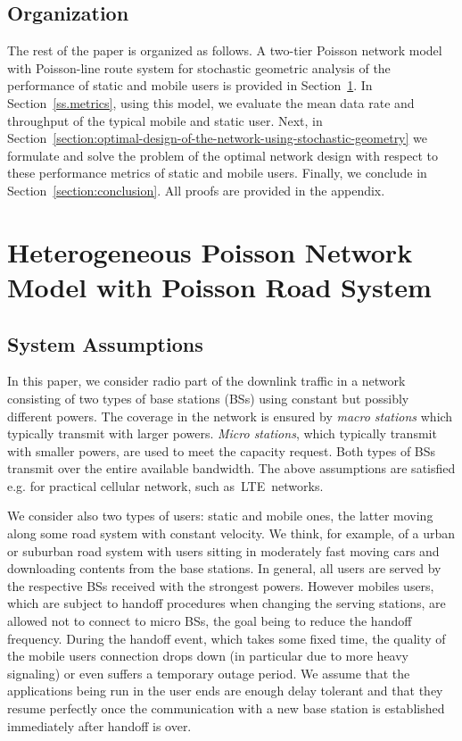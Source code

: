 \documentclass[10pt,journal]{IEEEtran}
\begin{document}
\subsection{Organization}\label{subsection:organization}
The rest of the paper is organized as follows. A two-tier Poisson
network model with Poisson-line route system  for
stochastic geometric analysis of the performance of static and mobile
users is 
provided in Section~\ref{section:system_model_and_notation}. 
In Section~\ref{ss.metrics}, using this model,
we evaluate the mean data rate and
throughput  of the typical mobile and static user. 
Next, in
Section~\ref{section:optimal-design-of-the-network-using-stochastic-geometry}
we formulate and solve the problem of the optimal  network design
with respect to these performance metrics of static and mobile users. 
Finally, we conclude in Section~\ref{section:conclusion}. All proofs are provided in the appendix.















\section{Heterogeneous Poisson Network Model with Poisson Road System}\label{section:system_model_and_notation}

\subsection{System Assumptions}
In this paper, we consider  radio part of the downlink traffic
in a network consisting of two types of base stations (BSs) using constant
but possibly different powers. The coverage in the network is ensured
by {\em macro stations} which typically transmit with larger powers. 
{\em Micro stations}, which typically transmit with smaller powers, 
are used to meet the capacity request. 
Both types of BSs transmit over the entire available bandwidth.
The above assumptions are satisfied e.g. for practical cellular
network, such as~LTE~networks. 

 
We consider also two types of users: static and mobile ones, the latter moving along some road system with constant
velocity. We think, for example, of a urban or suburban road system with  users sitting in
moderately fast moving cars and downloading contents from the base stations.
In general, all users are served by the respective  BSs received with the
strongest powers. However  mobiles users, which are  subject to handoff procedures when
changing the serving stations, are allowed not to connect to micro
BSs, the goal being to reduce the handoff frequency. 
During the handoff event, which takes some fixed time, the quality of
the mobile users connection drops down (in particular due to more
heavy signaling) or even suffers  a temporary
outage period. We assume that the applications being run in the user
ends are enough delay
tolerant and that they  resume perfectly once the communication with a new base
station is established immediately after handoff is over.
\end{document}
